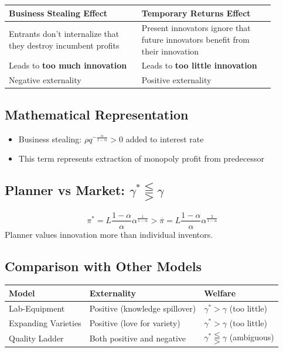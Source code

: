 \documentclass[a4paper,11pt]{article}
\begin{document}
\begin{center}
\begin{tabular}{p{0.45\linewidth}p{0.45\linewidth}}
\toprule
\textbf{Business Stealing Effect} & \textbf{Temporary Returns Effect} \\
\midrule
Entrants don't internalize that they destroy incumbent profits & Present innovators ignore that future innovators benefit from their innovation \\
Leads to \textbf{too much innovation} & Leads to \textbf{too little innovation} \\
Negative externality & Positive externality \\
\bottomrule
\end{tabular}
\end{center}

\subsection*{Mathematical Representation}
\begin{itemize}
    \item Business stealing: $\rho q^{-\frac{\alpha}{1-\alpha}} > 0$ added to interest rate
    \item This term represents extraction of monopoly profit from predecessor
\end{itemize}

\subsection*{Planner vs Market: $\gamma^* \lesseqqgtr \gamma$}
\begin{keyformulabox}
\[
\pi^* = L\frac{1-\alpha}{\alpha}\alpha^{\frac{1}{1-\alpha}} > \overline{\pi} = L\frac{1-\alpha}{\alpha}\alpha^{\frac{2}{1-\alpha}}
\]
Planner values innovation more than individual inventors.
\end{keyformulabox}

\subsection*{Comparison with Other Models}
\begin{center}
\begin{tabular}{lll}
\toprule
\textbf{Model} & \textbf{Externality} & \textbf{Welfare} \\
\midrule
Lab-Equipment & Positive (knowledge spillover) & $\gamma^* > \gamma$ (too little) \\
Expanding Varieties & Positive (love for variety) & $\gamma^* > \gamma$ (too little) \\
Quality Ladder & Both positive and negative & $\gamma^* \lesseqqgtr \gamma$ (ambiguous) \\
\bottomrule
\end{tabular}
\end{center}
\end{document}
